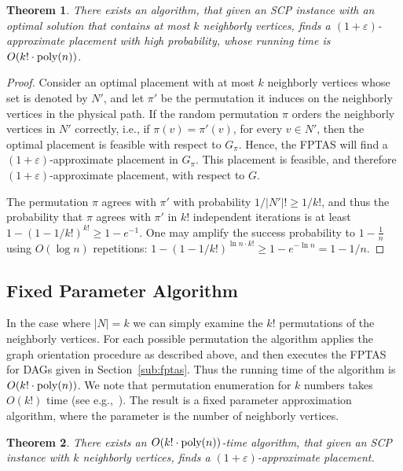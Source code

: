 \documentclass[11pt]{article}
\newtheorem{theorem}{Theorem}
\newcommand{\inv}[1]{\frac{1}{#1}}
\newcommand{\abs}[1]{\left| #1 \right|}
\newcommand{\eps}{\varepsilon}
\newcommand{\scp}{\textsc{SCP}\xspace}
\begin{document}
\begin{theorem}
There exists an algorithm, that given an \scp instance with an optimal
solution that contains at most $k$ neighborly vertices, finds a
$(1+\eps)$-approximate placement with high probability, whose
running time is $O(k! \cdot \text{\rm poly}(n))$.
\end{theorem}
\begin{proof}
Consider an optimal placement with at most $k$ neighborly vertices
whose set is denoted by $N'$, and let $\pi'$ be the permutation it
induces on the neighborly vertices in the physical path.
%
If the random permutation $\pi$ orders the neighborly vertices in $N'$
correctly, i.e., if $\pi(v) = \pi'(v)$, for every $v \in N'$, then the
optimal placement is feasible with respect to $G_\pi$.  Hence, the
FPTAS will find a $(1+\eps)$-approximate placement in $G_\pi$.  This
placement is feasible, and therefore $(1+\eps)$-approximate placement,
with respect to $G$.

The permutation $\pi$ agrees with $\pi'$ with probability $1/\abs{N'}!
\geq 1/k!$, and thus the probability that $\pi$ agrees with $\pi'$ in
$k!$ independent iterations is at least $1 - (1 - 1/k!)^{k!} \geq 1 -
e^{-1}$.  One may amplify the success probability to $1 - \inv{n}$
using $O(\log n)$ repetitions: $1 - (1 - 1/k!)^{\ln n \cdot k!} \geq 1
- e^{-\ln n} = 1 - 1/n$.
\end{proof}


\subsection{Fixed Parameter Algorithm}

In the case where $\abs{N} = k$ we can simply examine the $k!$
permutations of the neighborly vertices.  For each possible
permutation the algorithm applies the graph orientation procedure as
described above, and then executes the FPTAS for DAGs given in
Section~\ref{sub:fptas}.  Thus the running time of the algorithm is
$O(k! \cdot \text{\rm poly}(n))$.
%
We note that permutation enumeration for $k$ numbers takes $O(k!)$
time (see e.g.,~\cite{Even73,Sedgewick77}).
%
The result is a fixed parameter approximation algorithm, where the
parameter is the number of neighborly vertices.

\begin{theorem}
There exists an $O(k! \cdot \text{\rm poly}(n))$-time algorithm, that
given an \scp instance with $k$ neighborly vertices, finds a
$(1+\eps)$-approximate placement.
\end{theorem}
\end{document}
